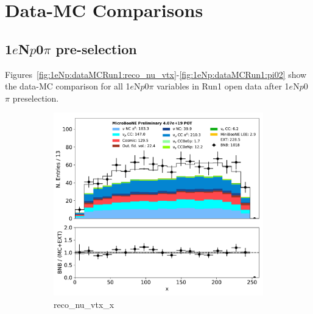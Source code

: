 \documentclass[a4paper]{article}
\newcommand{\npsel}{1$e$N$p$0$\pi$ }
\begin{document}
\newpage

\appendix

\section{Data-MC Comparisons}
\label{sec:datamc:plots}

\subsection{\npsel pre-selection}

Figures~\ref{fig:1eNp:dataMCRun1:reco_nu_vtx}-\ref{fig:1eNp:dataMCRun1:pi02} show the data-MC comparison for all \npsel variables in Run1 open data after \npsel preselection.

\begin{figure}[H] 
\begin{center}
    \begin{subfigure}[b]{0.3\textwidth}
    \centering
    \includegraphics[width=1.00\textwidth]{1eNp/dataMCRun1/reco_nu_vtx_x01152020.pdf}
    \caption{\label{fig:1eNp:dataMCRun1:reco_nu_vtx_x} reco\_nu\_vtx\_x }
    \end{subfigure}
    \begin{subfigure}[b]{0.3\textwidth}
    \centering

\end{subfigure}
\end{center}
\end{figure}
\end{document}
